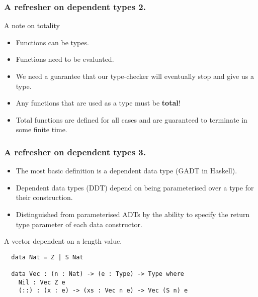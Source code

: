 \documentclass{beamer}
\begin{document}
\begin{frame}[fragile]
  \frametitle{A refresher on dependent types 2.}
  \begin{block}{A note on totality}
    \begin{itemize}
      \item Functions can be types.
      \item Functions need to be evaluated.
      \item We need a guarantee that our type-checker
        will eventually stop and give us a type.
      \item Any functions that are used as a type must be
        \textbf{total}!
      \item Total functions are defined for all cases and are guaranteed
        to terminate in some finite time.
    \end{itemize}
  \end{block}
\end{frame}

\begin{frame}[fragile]
\frametitle{A refresher on dependent types 3.}
\begin{itemize}
  \item The most basic definition is a dependent data type (GADT in
          Haskell).
  \item Dependent data types (DDT) depend on being parameterised over a
        type for their construction.
  \item Distinguished from parameterised ADTs by the ability to
        specify the return type parameter of each data constructor.
\end{itemize}
\begin{minipage}{0.5\textwidth}
\begin{block}{A vector dependent on a length value.}
\begin{verbatim}
  data Nat = Z | S Nat

  data Vec : (n : Nat) -> (e : Type) -> Type where
    Nil : Vec Z e
    (::) : (x : e) -> (xs : Vec n e) -> Vec (S n) e
\end{verbatim}
\end{block}
\end{minipage}
\end{frame}
\end{document}
